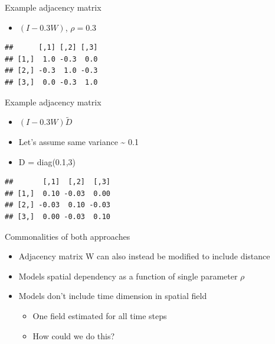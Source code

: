\documentclass[
  ignorenonframetext,
]{beamer}
\providecommand{\tightlist}{%
  \setlength{\itemsep}{0pt}\setlength{\parskip}{0pt}}
\begin{document}
\begin{frame}[fragile]{Example adjacency matrix}
\protect\hypertarget{example-adjacency-matrix-1}{}

\begin{itemize}
\tightlist
\item
  \((I-0.3 W)\), \(\rho=0.3\)
\end{itemize}

\begin{verbatim}
##      [,1] [,2] [,3]
## [1,]  1.0 -0.3  0.0
## [2,] -0.3  1.0 -0.3
## [3,]  0.0 -0.3  1.0
\end{verbatim}

\end{frame}

\begin{frame}[fragile]{Example adjacency matrix}
\protect\hypertarget{example-adjacency-matrix-2}{}

\begin{itemize}
\tightlist
\item
  \((I-0.3 W)\widetilde { D }\)
\item
  Let's assume same variance \textasciitilde{} 0.1
\item
  D = diag(0.1,3)
\end{itemize}

\begin{verbatim}
##       [,1]  [,2]  [,3]
## [1,]  0.10 -0.03  0.00
## [2,] -0.03  0.10 -0.03
## [3,]  0.00 -0.03  0.10
\end{verbatim}

\end{frame}

\begin{frame}{Commonalities of both approaches}
\protect\hypertarget{commonalities-of-both-approaches}{}

\begin{itemize}
\item
  Adjacency matrix W can also instead be modified to include distance
\item
  Models spatial dependency as a function of single parameter \(\rho\)
\item
  Models don't include time dimension in spatial field

  \begin{itemize}
  \tightlist
  \item
    One field estimated for all time steps
  \item
    How could we do this?
  \end{itemize}
\end{itemize}

\end{frame}
\end{document}
